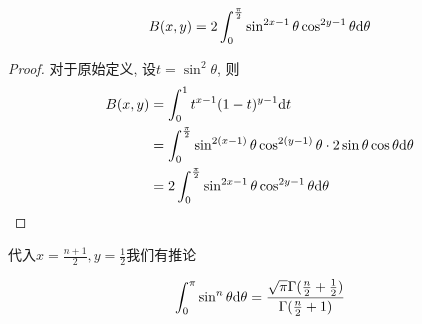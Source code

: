 \begin{theorem}
    \begin{equation}
        B(x,y)=2\int_0^{\frac\pi2}\sin^{2x-1}\theta\cos^{2y-1}\theta\mathrm d\theta
    \end{equation}
\end{theorem}
\begin{proof}
    对于原始定义, 设$t=\sin^2\theta$, 则
    \begin{align}
        B(x,y)&=\int_0^1 t^{x-1}(1-t)^{y-1}\mathrm d t\\
        &=\int_0^{\frac\pi2}\sin^{2(x-1)}\theta\cos^{2(y-1)}\theta\cdot2\sin\theta\cos\theta\mathrm d\theta\\
        &=2\int_0^{\frac\pi2}\sin^{2x-1}\theta\cos^{2y-1}\theta\mathrm d\theta
    \end{align}
\end{proof}
代入$x=\frac{n+1}2, y=\frac12$我们有推论
\begin{theorem}\label{sin-n-integral}
    \begin{equation}
        \int_0^{\pi}\sin^n\theta\mathrm d\theta=\frac{\sqrt\pi\Gamma(\frac n2+\frac 12)}{\Gamma(\frac n2+1)}
    \end{equation}
\end{theorem}

